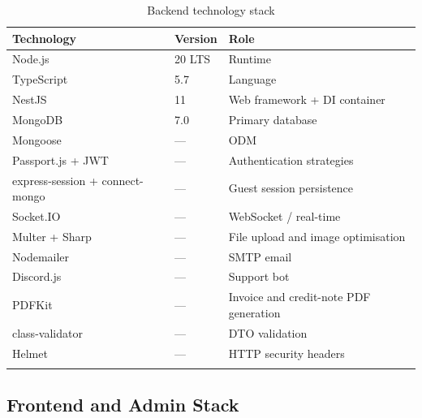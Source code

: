 \begin{longtable}{|m{4.5cm}|m{2cm}|m{7cm}|}
    \hline
    \textbf{Technology}             & \textbf{Version} & \textbf{Role}                          \\
    \hline
    \endhead
    \endfoot
    \endlastfoot
    \hline
    Node.js                         & 20 LTS           & Runtime                                \\
    \hline
    TypeScript                      & 5.7              & Language                               \\
    \hline
    NestJS                          & 11               & Web framework + DI container           \\
    \hline
    MongoDB                         & 7.0              & Primary database                       \\
    \hline
    Mongoose                        & ---              & ODM                                    \\
    \hline
    Passport.js + JWT               & ---              & Authentication strategies              \\
    \hline
    express-session + connect-mongo & ---              & Guest session persistence              \\
    \hline
    Socket.IO                       & ---              & WebSocket / real-time                  \\
    \hline
    Multer + Sharp                  & ---              & File upload and image optimisation     \\
    \hline
    Nodemailer                      & ---              & SMTP email                             \\
    \hline
    Discord.js                      & ---              & Support bot                            \\
    \hline
    PDFKit                          & ---              & Invoice and credit-note PDF generation \\
    \hline
    class-validator                 & ---              & DTO validation                         \\
    \hline
    Helmet                          & ---              & HTTP security headers                  \\
    \hline
    \caption{Backend technology stack}
    \label{tab:backend_stack}
\end{longtable}

\subsection{Frontend and Admin Stack}

